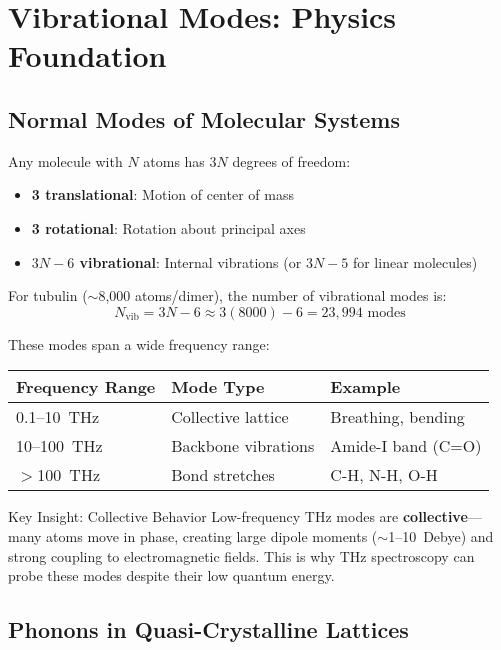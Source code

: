 \section{Vibrational Modes: Physics Foundation}

\subsection{Normal Modes of Molecular Systems}

Any molecule with $N$ atoms has $3N$ degrees of freedom:
\begin{itemize}
\item \textbf{3 translational}: Motion of center of mass
\item \textbf{3 rotational}: Rotation about principal axes
\item \textbf{$3N - 6$ vibrational}: Internal vibrations (or $3N - 5$ for linear molecules)
\end{itemize}

For tubulin ($\sim$8,000 atoms/dimer), the number of vibrational modes is:
\begin{equation}
N_{\text{vib}} = 3N - 6 \approx 3(8000) - 6 = 23{,}994 \text{ modes}
\label{eq:tubulin-modes}
\end{equation}

These modes span a wide frequency range:
\begin{center}
\begin{tabular}{@{}lll@{}}
\toprule
\textbf{Frequency Range} & \textbf{Mode Type} & \textbf{Example} \\
\midrule
0.1--10~THz & Collective lattice & Breathing, bending \\
10--100~THz & Backbone vibrations & Amide-I band (C=O) \\
$>$100~THz & Bond stretches & C-H, N-H, O-H \\
\bottomrule
\end{tabular}
\end{center}

\begin{calloutbox}{Key Insight: Collective Behavior}
Low-frequency THz modes are \textbf{collective}---many atoms move in phase, creating large dipole moments ($\sim$1--10~Debye) and strong coupling to electromagnetic fields. This is why THz spectroscopy can probe these modes despite their low quantum energy.
\end{calloutbox}

\subsection{Phonons in Quasi-Crystalline Lattices}

